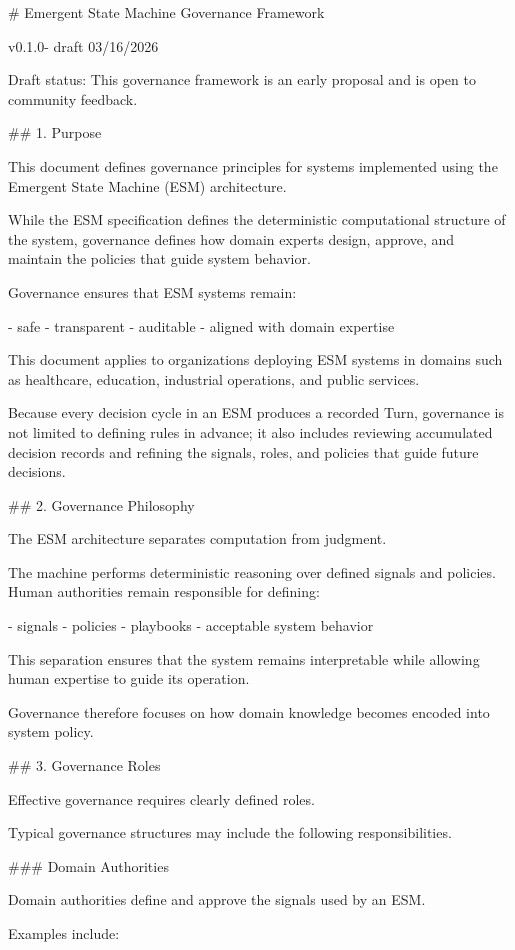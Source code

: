 # Emergent State Machine Governance Framework

v0.1.0- draft
03/16/2026

Draft status: This governance framework is an early proposal and is open to community feedback.


## 1. Purpose

This document defines governance principles for systems implemented using the Emergent State Machine (ESM) architecture.

While the ESM specification defines the deterministic computational structure of the system, governance defines how domain experts design, approve, and maintain the policies that guide system behavior.

Governance ensures that ESM systems remain:

- safe
- transparent
- auditable
- aligned with domain expertise

This document applies to organizations deploying ESM systems in domains such as healthcare, education, industrial operations, and public services.

Because every decision cycle in an ESM produces a recorded Turn, governance is not limited to defining rules in advance; it also includes reviewing accumulated decision records and refining the signals, roles, and policies that guide future decisions.

## 2. Governance Philosophy

The ESM architecture separates computation from judgment.

The machine performs deterministic reasoning over defined signals and policies. Human authorities remain responsible for defining:

- signals
- policies
- playbooks
- acceptable system behavior

This separation ensures that the system remains interpretable while allowing human expertise to guide its operation.

Governance therefore focuses on how domain knowledge becomes encoded into system policy.

## 3. Governance Roles

Effective governance requires clearly defined roles.

Typical governance structures may include the following responsibilities.

### Domain Authorities

Domain authorities define and approve the signals used by an ESM.

Examples include:

